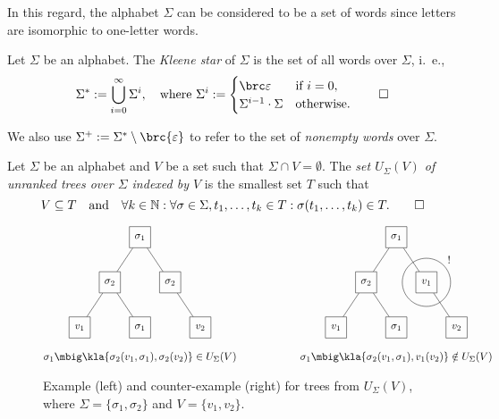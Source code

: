 In this regard, the alphabet $\Sigma$ can be considered to be a set of words
since letters are isomorphic to one-letter words.

\begin{definition}
 Let $\Sigma$ be an alphabet. The \emph{Kleene star} of $\Sigma$ is the set of
 all words over $\Sigma$, i.~e.,
 \[
  \Sigma^* := \bigcup_{i=0}^\infty \Sigma^i, \quad
  \text{where }\Sigma^i := \begin{cases}
   \brc\eps & \text{if } i = 0, \\
   \Sigma^{i-1}\cdot\Sigma & \text{otherwise}.
  \end{cases}\qedhere
 \]
\end{definition}

We also use $\Sigma^+ := \Sigma^* \setminus\brc{\eps}$ to refer to the set of
\emph{nonempty words} over $\Sigma$.

\begin{definition}
 Let $\Sigma$ be an alphabet and $V$ be a set such that $\Sigma\cap
 V=\emptyset$. The \emph{set $U_\Sigma(V)$ of unranked trees over $\Sigma$
 indexed by $V$} is the smallest set $T$ such that
 \[
  V \subseteq T \quad\text{and}\quad \forall k\in\mathbb N: \forall \sigma\in\Sigma, t_1,\ldots,t_k\in T: \sigma(t_1,\ldots,t_k)\in T.
  \qedhere
 \]
\end{definition}

\begin{figure}[t!]
 \[\begin{matrix}
  \begin{tikzpicture}[every node/.style={rectangle,draw,minimum size=2em},baseline=(current bounding box.center)]
   \node (n)   at (+0,+0.0) { $\sigma_1$ };
   \node (n1)  at (-1,-1.5) { $\sigma_2$ } edge (n);
   \node (n2)  at (+1,-1.5) { $\sigma_2$ } edge (n);
   \node (n11) at (-2,-3.0) { $v_1$ } edge (n1);
   \node (n12) at (+0,-3.0) { $\sigma_1$ } edge (n1);
   \node (n21) at (+2,-3.0) { $v_2$ } edge (n2);
  \end{tikzpicture}
  &\hspace*{4em}&
  \begin{tikzpicture}[every node/.style={rectangle,draw,minimum size=2em},baseline=(current bounding box.center)]
   \node (n)   at (+0,+0.0) { $\sigma_1$ };
   \node (n1)  at (-1,-1.5) { $\sigma_2$ } edge (n);
   \node (n2)  at (+1,-1.5) { $v_1$ } edge (n);
   \node (n11) at (-2,-3.0) { $v_1$ } edge (n1);
   \node (n12) at (+0,-3.0) { $\sigma_1$ } edge (n1);
   \node (n21) at (+2,-3.0) { $v_2$ } edge (n2);
   \draw (n2) circle (0.8);
   \node[draw=none] at (+1.75,-0.75) {!};
  \end{tikzpicture}
  \\\\
  \sigma_1\mbig\kla{\sigma_2(v_1,\sigma_1), \sigma_2(v_2)} \in U_\Sigma(V) &&
  \sigma_1\mbig\kla{\sigma_2(v_1,\sigma_1), v_1(v_2)} \notin U_\Sigma(V)
 \end{matrix}\]
 \caption{
  Example (left) and counter-example (right) for trees from $U_\Sigma(V)$,
  where $\Sigma = \{\sigma_1,\sigma_2\}$ and $V = \{v_1,v_2\}$.
  \label{fig:02-trees1}
 }
\end{figure}

